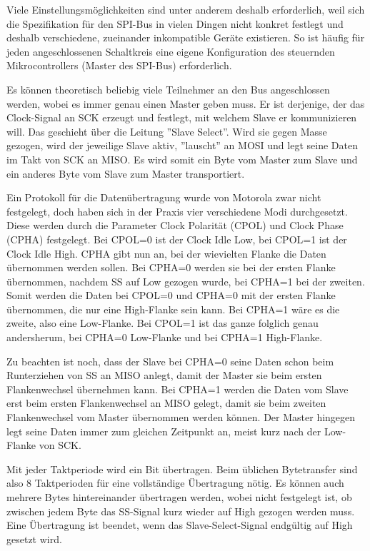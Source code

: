 Viele Einstellungsmöglichkeiten sind unter anderem deshalb erforderlich, weil sich die Spezifikation
für den SPI-Bus in vielen Dingen nicht konkret festlegt und deshalb verschiedene, zueinander
inkompatible Geräte existieren. So ist häufig für jeden angeschlossenen Schaltkreis eine eigene
Konfiguration des steuernden Mikrocontrollers (Master des SPI-Bus) erforderlich.

Es können theoretisch beliebig viele Teilnehmer an den Bus angeschlossen werden, wobei es immer
genau einen Master geben muss. Er ist derjenige, der das Clock-Signal an SCK erzeugt und festlegt,
mit welchem Slave er kommunizieren will. Das geschieht über die Leitung ''Slave Select''. Wird sie
gegen Masse gezogen, wird der jeweilige Slave aktiv, ''lauscht'' an MOSI und legt seine Daten im
Takt von SCK an MISO. Es wird somit ein Byte vom Master zum Slave und ein anderes Byte vom Slave zum
Master transportiert.

Ein Protokoll für die Datenübertragung wurde von Motorola zwar nicht festgelegt, doch haben sich in
der Praxis vier verschiedene Modi durchgesetzt. Diese werden durch die Parameter Clock Polarität
(CPOL) und Clock Phase (CPHA) festgelegt. Bei CPOL=0 ist der Clock Idle Low, bei CPOL=1 ist der
Clock Idle High. CPHA gibt nun an, bei der wievielten Flanke die Daten übernommen werden sollen. Bei
CPHA=0 werden sie bei der ersten Flanke übernommen, nachdem SS auf Low gezogen wurde, bei CPHA=1 bei
der zweiten. Somit werden die Daten bei CPOL=0 und CPHA=0 mit der ersten Flanke übernommen, die nur
eine High-Flanke sein kann. Bei CPHA=1 wäre es die zweite, also eine Low-Flanke. Bei CPOL=1 ist das
ganze folglich genau andersherum, bei CPHA=0 Low-Flanke und bei CPHA=1 High-Flanke.

Zu beachten ist noch, dass der Slave bei CPHA=0 seine Daten schon beim Runterziehen von SS an MISO
anlegt, damit der Master sie beim ersten Flankenwechsel übernehmen kann. Bei CPHA=1 werden die Daten
vom Slave erst beim ersten Flankenwechsel an MISO gelegt, damit sie beim zweiten Flankenwechsel vom
Master übernommen werden können. Der Master hingegen legt seine Daten immer zum gleichen Zeitpunkt
an, meist kurz nach der Low-Flanke von SCK.

Mit jeder Taktperiode wird ein Bit übertragen. Beim üblichen Bytetransfer sind also 8 Taktperioden
für eine vollständige Übertragung nötig. Es können auch mehrere Bytes hintereinander übertragen
werden, wobei nicht festgelegt ist, ob zwischen jedem Byte das SS-Signal kurz wieder auf High
gezogen werden muss. Eine Übertragung ist beendet, wenn das Slave-Select-Signal endgültig auf High
gesetzt wird.

